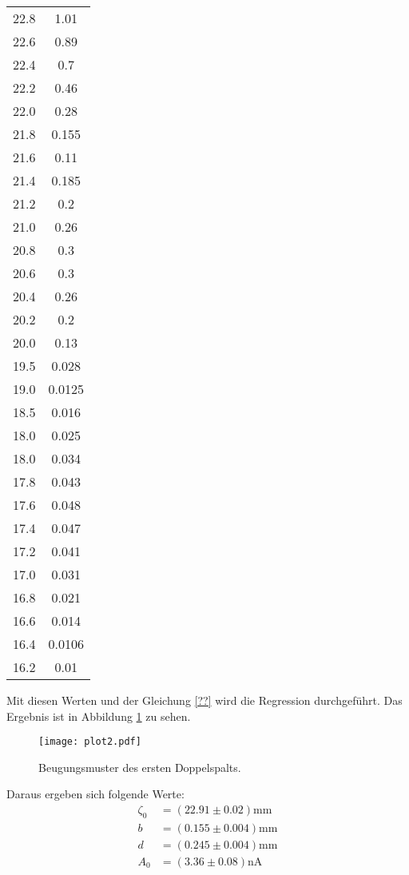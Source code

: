 \begin{table}
\begin{tabular}{c c}
  22.8  &  1.01 \\
  22.6  &  0.89 \\
  22.4  &  0.7 \\
  22.2  &  0.46 \\
  22.0  &  0.28 \\
  21.8  &  0.155 \\
  21.6  &  0.11 \\
  21.4  &  0.185 \\
  21.2  &  0.2 \\
  21.0  &  0.26 \\
  20.8  &  0.3 \\
  20.6  &  0.3 \\
  20.4  &  0.26 \\
  20.2  &  0.2 \\
  20.0  &  0.13 \\
  19.5  &  0.028 \\
  19.0  &  0.0125 \\
  18.5  &  0.016 \\
  18.0  &  0.025 \\
  18.0  &  0.034 \\
  17.8  &  0.043 \\
  17.6  &  0.048 \\
  17.4  &  0.047 \\
  17.2  &  0.041 \\
  17.0  &  0.031 \\
  16.8  &  0.021 \\
  16.6  &  0.014 \\
  16.4  &  0.0106 \\
  16.2  &  0.01 \\
  \bottomrule
\end{tabular}
\end{table}
\FloatBarrier

Mit diesen Werten und der Gleichung \eqref{??} wird die Regression durchgeführt.
Das Ergebnis ist in Abbildung \ref{fig:plot2} zu sehen.

\begin{figure}
  \centering
  \texttt{[image: plot2.pdf]}
  \caption{Beugungsmuster des ersten Doppelspalts.}
  \label{fig:plot2}
\end{figure}
\FloatBarrier

Daraus ergeben sich folgende Werte:
\begin{align*}
  \zeta_0 &= (22.91 \pm 0.02) \text{mm} \\
  b &= (0.155 \pm 0.004) \text{mm} \\
  d &= (0.245 \pm 0.004) \text{mm} \\
  A_0 &= (3.36 \pm 0.08) \text{nA}
\end{align*}

